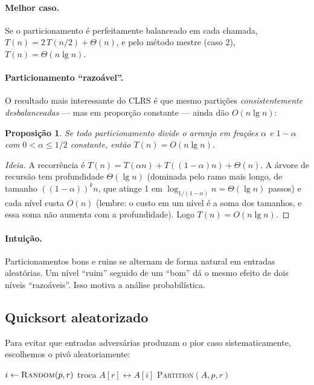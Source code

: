 \documentclass[9pt,a4paper]{extarticle}
\newcommand{\ntc}[1]{\textcolor{notice}{#1}}
\newtheorem{proposition}[theorem]{Proposição}
\theoremstyle{definition}
\begin{document}
\paragraph{Melhor caso.} Se o particionamento é perfeitamente balanceado
em cada chamada, $T(n) = 2\, T(n/2) + \Theta(n)$, e pelo método mestre
(caso 2), $T(n) = \Theta(n\lg n)$.

\paragraph{Particionamento ``razoável''.} O resultado mais interessante
do CLRS é que mesmo partições \textit{consistentemente desbalanceadas} ---
mas em proporção constante --- ainda dão $O(n\lg n)$:

\begin{proposition}
Se todo particionamento divide o arranjo em frações $\alpha$ e $1 - \alpha$
com $0 < \alpha \le 1/2$ constante, então $T(n) = O(n\lg n)$.
\end{proposition}

\begin{proof}[Ideia]
A recorrência é $T(n) = T(\alpha n) + T((1-\alpha) n) + \Theta(n)$. A
árvore de recursão tem profundidade $\Theta(\lg n)$ (dominada pelo ramo
mais longo, de tamanho $((1-\alpha))^k n$, que atinge 1 em
$\log_{1/(1-\alpha)} n = \Theta(\lg n)$ passos) e cada nível custa $O(n)$
\ntc{(lembre: o custo em um nível é a soma dos tamanhos, e essa soma não
aumenta com a profundidade)}. Logo $T(n) = O(n\lg n)$.
\end{proof}

\paragraph{Intuição.} Particionamentos bons e ruins se alternam de forma
natural em entradas aleatórias. Um nível ``ruim'' seguido de um ``bom''
dá o mesmo efeito de dois níveis ``razoáveis''. Isso motiva a análise
probabilística.

\subsection{Quicksort aleatorizado}

Para evitar que entradas adversárias produzam o pior caso sistematicamente,
escolhemos o pivô aleatoriamente:

\begin{algorithm}[H]
\caption{\textsc{Randomized-Partition}$(A, p, r)$}
\begin{algorithmic}[1]
\State $i \gets \textsc{Random}(p, r)$
\State troca $A[r] \leftrightarrow A[i]$
\State \Return \textsc{Partition}$(A, p, r)$
\end{algorithmic}
\end{algorithm}
\end{document}
